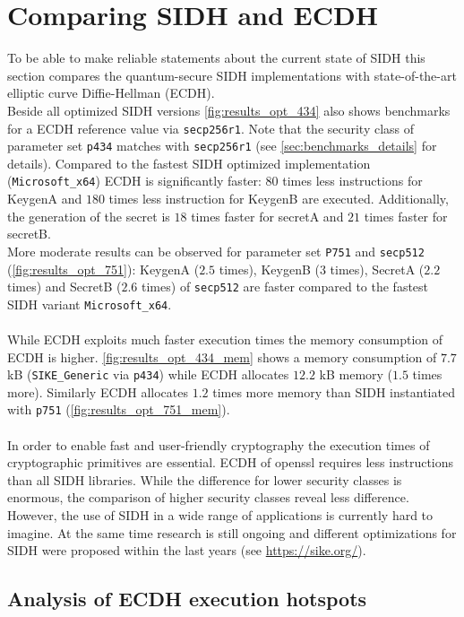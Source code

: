\section{Comparing SIDH and ECDH} \label{sec:analysis_effiency_ecdh}

To be able to make reliable statements about the current state of SIDH this section compares the quantum-secure SIDH implementations with state-of-the-art elliptic curve Diffie-Hellman (ECDH). \\
Beside all optimized SIDH versions \autoref{fig:results_opt_434} also shows benchmarks for a ECDH reference value via \texttt{secp256r1}. Note that the security class of parameter set \texttt{p434} matches with \texttt{secp256r1} (see \autoref{sec:benchmarks_details} for details). Compared to the fastest SIDH optimized implementation (\texttt{Microsoft\_x64}) ECDH is significantly faster: $80$ times less instructions for KeygenA and $180$ times less instruction for KeygenB are executed. Additionally, the generation of the secret is $18$ times faster for secretA and $21$ times faster for secretB.\\
More moderate results can be observed for parameter set \texttt{P751} and \texttt{secp512} (\autoref{fig:results_opt_751}): KeygenA ($2.5$ times),  KeygenB ($3$ times), SecretA ($2.2$ times) and SecretB ($2.6$ times) of \texttt{secp512} are faster compared to the fastest SIDH variant \texttt{Microsoft\_x64}.
\\\\
While ECDH exploits much faster execution times the memory consumption of ECDH is higher.  \autoref{fig:results_opt_434_mem} shows a memory consumption of $7.7$ kB (\texttt{SIKE\_Generic} via \texttt{p434}) while ECDH allocates $12.2$ kB memory ($1.5$ times more). Similarly ECDH allocates $1.2$ times more memory than SIDH instantiated with \texttt{p751} (\autoref{fig:results_opt_751_mem}).
\\\\
In order to enable fast and user-friendly cryptography the execution times of cryptographic primitives are essential. ECDH of openssl requires less instructions than all SIDH libraries. While the difference for lower security classes is enormous, the comparison of higher security classes reveal less difference. However, the use of SIDH in a wide range of applications is currently hard to imagine. At the same time research is still ongoing and different optimizations for SIDH were proposed within the last years (see \url{https://sike.org/}). 
\subsection{Analysis of ECDH execution hotspots}

